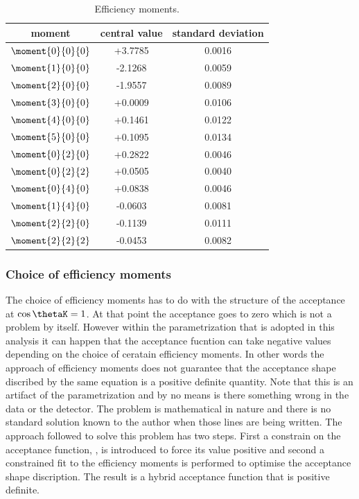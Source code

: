 \begin{table}[h]
  \centering 
  \caption{ Efficiency moments. }
  \renewcommand{\arraystretch}{1.2}
  \label{eff_moms_table}
  \begin{tabular}{ccc}
    \hline
    moment & central value & standard deviation \\
    \hline
    $\moment{0}{0}{0}$ & +3.7785  & 0.0016 \\
    $\moment{1}{0}{0}$ & -2.1268  & 0.0059 \\
    $\moment{2}{0}{0}$ & -1.9557  & 0.0089 \\
    $\moment{3}{0}{0}$ & +0.0009  & 0.0106 \\    
    $\moment{4}{0}{0}$ & +0.1461  & 0.0122 \\
    $\moment{5}{0}{0}$ & +0.1095  & 0.0134 \\
    
    $\moment{0}{2}{0}$ & +0.2822  & 0.0046 \\
    $\moment{0}{2}{2}$ & +0.0505  & 0.0040 \\
    $\moment{0}{4}{0}$ & +0.0838  & 0.0046 \\

    $\moment{1}{4}{0}$ & -0.0603  & 0.0081 \\
    $\moment{2}{2}{0}$ & -0.1139  & 0.0111 \\
    $\moment{2}{2}{2}$ & -0.0453  & 0.0082 \\
\hline
  \end{tabular}
\end{table}  


\subsubsection{Choice of efficiency moments}
The choice of efficiency moments has to do with the structure of the acceptance at $\cos\thetaK=1$. At that point the acceptance goes to zero
which is not a problem by itself. However within the parametrization that is adopted in this analysis it can happen that the acceptance fucntion
 can take negative values depending on the choice of ceratain efficiency moments. In other words the approach of efficiency moments does
not guarantee that the acceptance shape discribed by the same equation is a positive definite quantity. Note that this is an artifact of the parametrization
and by no means is there something wrong in the data or the detector. The problem is mathematical in nature and there is no standard solution known
to the author when those lines are being written. The approach followed to solve this problem has two steps. First a constrain on the acceptance function, , is 
introduced to force its value positive and second a constrained fit to the efficiency moments is performed to optimise the acceptance shape discription.
The result is a hybrid acceptance function that is positive definite.

